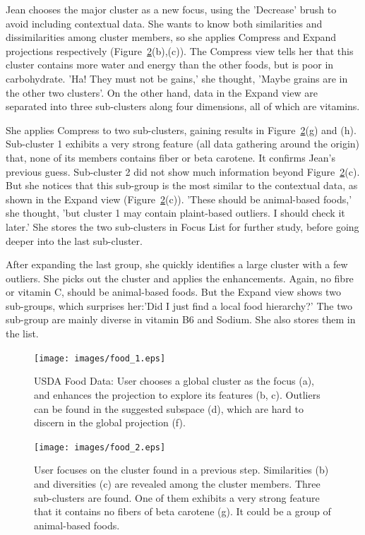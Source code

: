 Jean chooses the major cluster as a new focus, using the 'Decrease' brush to avoid including contextual data. She wants to know both similarities and dissimilarities among cluster members, so she applies Compress and Expand projections respectively (Figure~\ref{fig:food2}(b),(c)). The Compress view tells her that this cluster contains more water and energy than the other foods, but is poor in carbohydrate. 'Ha! They must not be gains,' she thought, 'Maybe grains are in the other two clusters'. On the other hand, data in the Expand view are separated into three sub-clusters along four dimensions, all of which are vitamins. 

She applies Compress to two sub-clusters, gaining results in Figure~\ref{fig:food2}(g) and (h). Sub-cluster 1 exhibits a very strong feature (all data gathering around the origin) that, none of its members contains fiber or beta carotene. It confirms Jean's previous guess. Sub-cluster 2 did not show much information beyond Figure~\ref{fig:food2}(c). But she notices that this sub-group is the most similar to the contextual data, as shown in the Expand view (Figure~\ref{fig:food2}(c)). 'These should be animal-based foods,' she thought, 'but cluster 1 may contain plaint-based outliers. I should check it later.' She stores the two sub-clusters in Focus List for further study, before going deeper into the last sub-cluster.

After expanding the last group, she quickly identifies a large cluster with a few outliers. She picks out the cluster and applies the enhancements. Again, no fibre or vitamin C, should be animal-based foods. But the Expand view shows two sub-groups, which surprises her:'Did I just find a local food hierarchy?' The two sub-group are mainly diverse in vitamin B6 and Sodium. She also stores them in the list.

\begin{figure}[htbp]
\centering
  \texttt{[image: images/food\_1.eps]}%
  \caption{USDA Food Data: User chooses a global cluster as the focus (a), and enhances the projection to explore its features (b, c). Outliers can be found in the suggested subspace (d), which are hard to discern in the global projection (f).}
\label{fig:food1}
  \end{figure}

\begin{figure}[htbp]
\centering
  \texttt{[image: images/food\_2.eps]}%
  \caption{User focuses on the cluster found in a previous step. Similarities (b) and diversities (c) are revealed among the cluster members. Three sub-clusters are found. One of them exhibits a very strong feature that it contains no fibers of beta carotene (g). It could be a group of animal-based foods.}
\label{fig:food2}
  \end{figure}

